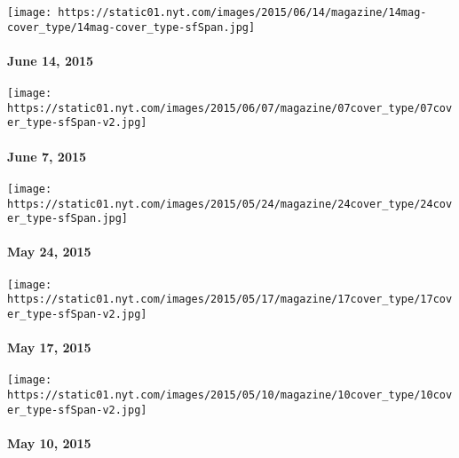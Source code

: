 \href{http://www.nytimes.com/indexes/2015/06/14/magazine/index.html}{}

\texttt{[image: https://static01.nyt.com/images/2015/06/14/magazine/14mag-cover\_type/14mag-cover\_type-sfSpan.jpg]}

\hypertarget{june-14-2015}{%
\paragraph{June 14, 2015}\label{june-14-2015}}

\href{http://www.nytimes.com/indexes/2015/06/07/magazine/index.html}{}

\texttt{[image: https://static01.nyt.com/images/2015/06/07/magazine/07cover\_type/07cover\_type-sfSpan-v2.jpg]}

\hypertarget{june-7-2015}{%
\paragraph{June 7, 2015}\label{june-7-2015}}

\href{http://www.nytimes.com/indexes/2015/05/24/magazine/index.html}{}

\texttt{[image: https://static01.nyt.com/images/2015/05/24/magazine/24cover\_type/24cover\_type-sfSpan.jpg]}

\hypertarget{may-24-2015}{%
\paragraph{May 24, 2015}\label{may-24-2015}}

\href{http://www.nytimes.com/indexes/2015/05/17/magazine/index.html}{}

\texttt{[image: https://static01.nyt.com/images/2015/05/17/magazine/17cover\_type/17cover\_type-sfSpan-v2.jpg]}

\hypertarget{may-17-2015}{%
\paragraph{May 17, 2015}\label{may-17-2015}}

\href{http://www.nytimes.com/indexes/2015/05/10/magazine/index.html}{}

\texttt{[image: https://static01.nyt.com/images/2015/05/10/magazine/10cover\_type/10cover\_type-sfSpan-v2.jpg]}

\hypertarget{may-10-2015}{%
\paragraph{May 10, 2015}\label{may-10-2015}}

